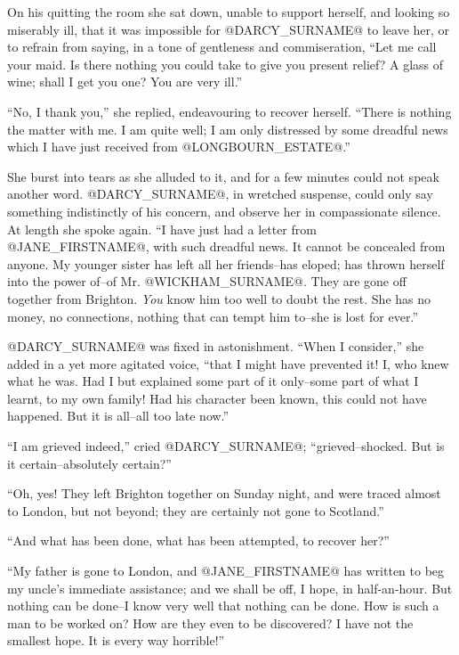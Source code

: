 On his quitting the room she sat down, unable to support herself, and
looking so miserably ill, that it was impossible for @DARCY_SURNAME@ to leave her,
or to refrain from saying, in a tone of gentleness and commiseration,
``Let me call your maid. Is there nothing you could take to give you
present relief? A glass of wine; shall I get you one? You are very ill.''

``No, I thank you,'' she replied, endeavouring to recover herself. ``There
is nothing the matter with me. I am quite well; I am only distressed by
some dreadful news which I have just received from @LONGBOURN_ESTATE@.''

She burst into tears as she alluded to it, and for a few minutes could
not speak another word. @DARCY_SURNAME@, in wretched suspense, could only say
something indistinctly of his concern, and observe her in compassionate
silence. At length she spoke again. ``I have just had a letter from @JANE_FIRSTNAME@,
with such dreadful news. It cannot be concealed from anyone. My younger
sister has left all her friends--has eloped; has thrown herself into
the power of--of Mr. @WICKHAM_SURNAME@. They are gone off together from Brighton.
\textit{You} know him too well to doubt the rest. She has no money, no
connections, nothing that can tempt him to--she is lost for ever.''

@DARCY_SURNAME@ was fixed in astonishment. ``When I consider,'' she added in a yet
more agitated voice, ``that I might have prevented it! I, who knew what
he was. Had I but explained some part of it only--some part of what I
learnt, to my own family! Had his character been known, this could not
have happened. But it is all--all too late now.''

``I am grieved indeed,'' cried @DARCY_SURNAME@; ``grieved--shocked. But is it
certain--absolutely certain?''

``Oh, yes! They left Brighton together on Sunday night, and were traced
almost to London, but not beyond; they are certainly not gone to
Scotland.''

``And what has been done, what has been attempted, to recover her?''

``My father is gone to London, and @JANE_FIRSTNAME@ has written to beg my uncle's
immediate assistance; and we shall be off, I hope, in half-an-hour. But
nothing can be done--I know very well that nothing can be done. How is
such a man to be worked on? How are they even to be discovered? I have
not the smallest hope. It is every way horrible!''

